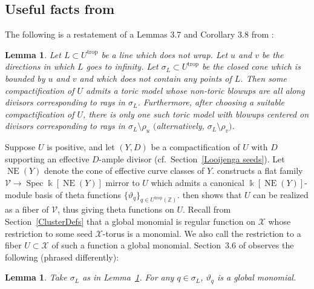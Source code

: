 \documentclass[11pt]{article}
\numberwithin{equation}{section}
\numberwithin{figure}{section}
\numberwithin{table}{section}
\DeclareMathOperator{\Spec}{Spec}
\DeclareMathOperator{\NE}{NE}
\DeclareMathOperator{\trop}{trop}
\let\bb=\mathbb
\let\rar=\rightarrow
\let\s=\mathcal
\newcommand {\kk} {\Bbbk}
\newtheorem{lem}[thm]{Lemma}
\theoremstyle{definition}
\begin{document}
\subsection{Useful facts from \cite{Man1}}\label{Man}
The following is a restatement of a Lemmas 3.7 and Corollary 3.8 from \cite{Man1}:

\begin{lem}\label{model}
Let $L\subset U^{\trop}$ be a line which does not wrap. Let $u$ and $v$ be the directions in which $L$ goes to infinity. Let $\sigma_L\subset U^{\trop}$ be the closed cone which is bounded by $u$ and $v$ and which does not contain any points of $L$. Then some compactification of $U$ admits a toric model whose non-toric blowups are all along divisors corresponding to rays in $\sigma_L$. Furthermore, after choosing a suitable compactification of $U$, there is only one such toric model with blowups centered on divisors corresponding to rays in $\sigma_L \setminus \rho_u$ $($alternatively, $\sigma_L \setminus \rho_v)$.
\end{lem}

Suppose $U$ is positive, and let $(Y,D)$ be a compactification of $U$ with $D$ supporting an effective $D$-ample divisor (cf.\ Section~\ref{Looijenga seeds}). Let $\NE(Y)$ denote the cone of effective curve classes of $Y$. \cite{GHK1} constructs a flat family $\s{V}\rar \Spec \kk[\NE(Y)]$ mirror to $U$ which admits a canonical $\kk[\NE(Y)]$-module basis of theta functions $\{\vartheta_q\}_{q\in U^{\trop}(\bb{Z})}$. \cite{GHK2} then shows that $U$ can be realized as a fiber of $\s{V}$, thus giving theta functions on $U$. Recall from Section~\ref{ClusterDefs} that a global monomial is regular function on $\s{X}$ whose restriction to some seed $\s{X}$-torus is a monomial. We also call the restriction to a fiber $U\subset \s{X}$ of such a function a global monomial. Section~3.6 of \cite{Man1} observes the following (phrased differently):

\begin{lem}\label{GlobalMonomial}Take $\sigma_L$ as in Lemma~{\rm \ref{model}}. For any $q\in \sigma_L$, $\vartheta_q$ is a global monomial.
\end{lem}
\end{document}
